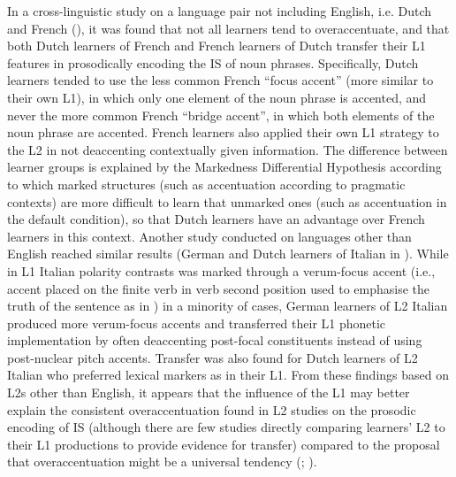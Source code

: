 In a cross-linguistic study on a language pair not including English, i.e. Dutch and French (\citealt{RasierEtAl2010}), it was found that not all learners tend to overaccentuate, and that both Dutch learners of French and French learners of Dutch transfer their L1 features in prosodically encoding the IS of noun phrases. Specifically, Dutch learners tended to use the less common French “focus accent” (more similar to their own L1), in which only one element of the noun phrase is accented, and never the more common French “bridge accent”, in which both elements of the noun phrase are accented. French learners also applied their own L1 strategy to the L2 in not deaccenting contextually given information. The difference between learner groups is explained by the Markedness Differential Hypothesis \citep{Eckman1977} according to which marked structures (such as accentuation according to pragmatic contexts) are more difficult to learn that unmarked ones (such as accentuation in the default condition), so that Dutch learners have an advantage over French learners in this context. Another study conducted on languages other than English reached similar results (German and Dutch learners of Italian in \citealt{TurcoEtAl2015}). While in L1 Italian polarity contrasts was marked through a verum-focus accent (i.e., accent placed on the finite verb in verb second position used to emphasise the truth of the sentence as in \citealt{Höhle1992}) in a minority of cases, German learners of L2 Italian produced more verum-focus accents and transferred their L1 phonetic implementation by often deaccenting post-focal constituents instead of using post-nuclear pitch accents. Transfer was also found for Dutch learners of L2 Italian who preferred lexical markers as in their L1. From these findings based on L2s other than English, it appears that the influence of the L1 may better explain the consistent overaccentuation found in L2 studies on the prosodic encoding of IS (although there are few studies directly comparing learners’ L2 to their L1 productions to provide evidence for transfer) compared to the proposal that overaccentuation might be a universal tendency (\citealt{GutEtAl2013}; \citealt{GutPillai2014}).

